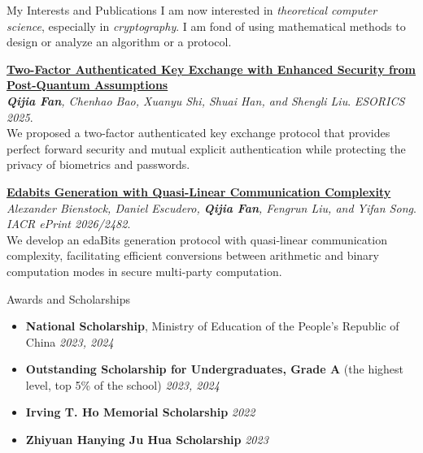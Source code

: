 \documentclass{resume} %
\begin{document}
\begin{rSection}{My Interests and Publications}
  I am now interested in \emph{theoretical computer science}, especially in \emph{cryptography}. I am fond of using mathematical methods to design or analyze an algorithm or a protocol.

{\bf \href{https://dl.acm.org/doi/10.1007/978-3-032-07891-9_8}{Two-Factor Authenticated Key Exchange with Enhanced Security from Post-Quantum Assumptions}}
\\ \emph{\textbf{Qijia Fan}, Chenhao Bao, Xuanyu Shi, Shuai Han, and Shengli Liu}. \emph{ESORICS 2025}.
\\ We proposed a two-factor authenticated key exchange protocol that provides perfect forward security and mutual explicit authentication while protecting the privacy of biometrics and passwords.

{\bf \href{https://eprint.iacr.org/2026/2482}{Edabits Generation with Quasi-Linear Communication Complexity}}
\\ \emph{Alexander Bienstock, Daniel Escudero, \textbf{Qijia Fan}, Fengrun Liu, and Yifan Song}. \emph{IACR ePrint 2026/2482}.
\\ We develop an edaBits generation protocol with quasi-linear communication complexity, facilitating efficient conversions between arithmetic and binary computation modes in secure multi-party computation.
\end{rSection}

\begin{rSection}{Awards and Scholarships}
  \begin{itemize}[leftmargin=*, parsep=0.5ex]
    \item {\bf National Scholarship}{, Ministry of Education of the People's Republic of China} \hfill{\em 2023, 2024}
    \item {\bf Outstanding Scholarship for Undergraduates, Grade A}{ (the highest level, top 5\% of the school)} \hfill{\em 2023, 2024}
    \item {\bf Irving T. Ho Memorial Scholarship} \hfill{\em 2022}
    \item {\bf Zhiyuan Hanying Ju Hua Scholarship} \hfill{\em 2023}
  \end{itemize}
\end{rSection}
\end{document}
